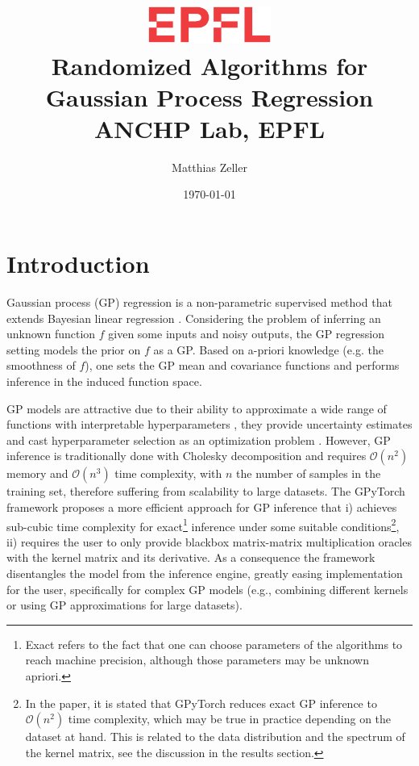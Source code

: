 \documentclass{article}
\title{
    \includegraphics[width=4cm]{res/EPFL-logo.eps}\\
    {\huge \textbf{Randomized Algorithms for \\Gaussian Process Regression}}\\
    ANCHP Lab, EPFL
}
\author{Matthias Zeller}
\date{\today}
\begin{document}
\maketitle


\section{Introduction}

Gaussian process (GP) regression is a non-parametric supervised method that extends Bayesian linear regression \cite{schulz_tutorial_2018, rasmussen_gaussian_2005, liu_when_2019, deringer_gaussian_2021}.
Considering the problem of inferring an unknown function $f$ given some inputs and noisy outputs, the GP regression setting models the prior on $f$ as a GP. Based on a-priori knowledge (e.g. the smoothness of $f$), one sets the GP mean and covariance functions and performs inference in the induced function space. 

GP models are attractive due to their ability to approximate a wide range of functions with interpretable hyperparameters \cite{rasmussen_gaussian_2005, belyaev_exact_2014},
they provide uncertainty estimates \cite{rasmussen_gaussian_2005, seeger_gaussian_2004}
and cast hyperparameter selection as an optimization problem \cite{gorbach_model_2017, rasmussen_gaussian_2005, seeger_gaussian_2004}.
However, GP inference is traditionally done with Cholesky decomposition and requires $\mathcal O(n^2)$ memory and $\mathcal O(n^3)$ time complexity, with $n$ the number of samples in the training set, therefore suffering from scalability to large datasets. The GPyTorch framework \cite{gardner_gpytorch_2021} proposes a more efficient approach for GP inference that i) achieves sub-cubic time complexity for exact\footnote{Exact refers to the fact that one can choose parameters of the algorithms to reach machine precision, although those parameters may be unknown apriori.} inference under some suitable conditions\footnote{In the paper, it is stated that GPyTorch reduces exact GP inference to $\mathcal O(n^2)$ time complexity, which may be true in practice depending on the dataset at hand. This is related to the data distribution and the spectrum of the kernel matrix, see the discussion in the results section.}, ii) requires the user to only provide blackbox matrix-matrix multiplication oracles with the kernel matrix and its derivative.
As a consequence the framework disentangles the model from the inference engine, greatly easing implementation for the user, specifically for complex GP models (e.g., combining different kernels or using GP approximations for large datasets). 
\end{document}
